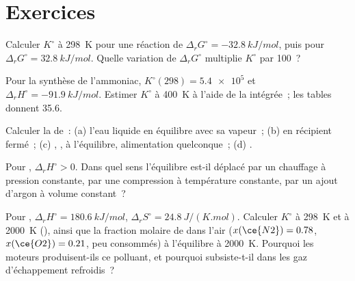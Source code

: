 \section{Exercices}

\begin{exercise}[$\star$]\label{exo:b2:equilibrium-shifts:1}
Calculer $K^\circ$ à \qty{298}{K} pour une réaction de $\Delta_r G^\circ =
\qty{-32.8}{kJ/mol}$, puis pour $\Delta_r G^\circ = \qty{+32.8}{kJ/mol}$.
Quelle variation de $\Delta_r G^\circ$ multiplie $K^\circ$ par 100~?
\end{exercise}

\begin{exercise}[$\star$]\label{exo:b2:equilibrium-shifts:2}
Pour la synthèse de l'ammoniac, $K^\circ(298) = \num{5.4e5}$ et $\Delta_r H^\circ =
\qty{-91.9}{kJ/mol}$. Estimer $K^\circ$ à \qty{400}{K} à l'aide de la  intégrée~; les tables donnent 35.6.
\end{exercise}

\begin{exercise}[$\star$]\label{exo:b2:equilibrium-shifts:3}
Calculer la  de~: (a) l'eau liquide en équilibre avec sa vapeur~;
(b)  en récipient fermé~; (c) ,
,  à l'équilibre, alimentation quelconque~; (d) .
\end{exercise}

\begin{exercise}[$\star$]\label{exo:b2:equilibrium-shifts:4}
Pour , $\Delta_r H^\circ > 0$. Dans quel sens
l'équilibre est-il déplacé par un chauffage à pression constante, par une compression à
température constante, par un ajout d'argon à volume constant~?
\end{exercise}

\begin{exercise}[$\star\star$]\label{exo:b2:equilibrium-shifts:5}
Pour , $\Delta_r H^\circ = \qty{180.6}{kJ/mol}$,
$\Delta_r S^\circ = \qty{24.8}{J/(K.mol)}$. Calculer $K^\circ$ à \qty{298}{K}
et à \qty{2000}{K} (), ainsi que la fraction molaire de
 dans l'air ($x(\ce{N2}) = 0.78$, $x(\ce{O2}) = 0.21$, peu consommés) à
l'équilibre à \qty{2000}{K}. Pourquoi les moteurs produisent-ils ce polluant, et pourquoi
subsiste-t-il dans les gaz d'échappement refroidis~?
\end{exercise}


